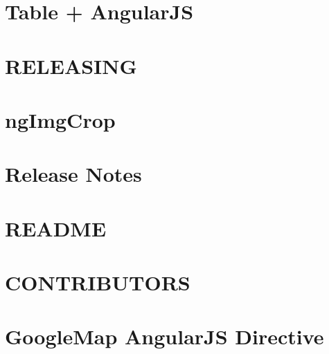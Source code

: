 \documentclass[twoside]{book}
\newcommand{\+}{\discretionary{\mbox{\scriptsize$\hookleftarrow$}}{}{}}
\begin{document}
\chapter{Table + Angular\+JS}
\label{md_app_web_bower_components_ng-table__r_e_a_d_m_e}

\chapter{R\+E\+L\+E\+A\+S\+I\+NG}
\label{md_app_web_bower_components_ng-table__r_e_l_e_a_s_i_n_g}

\chapter{ng\+Img\+Crop}
\label{md_app_web_bower_components_ng_img_crop__r_e_a_d_m_e}

\chapter{Release Notes}
\label{md_app_web_bower_components_ngmap__c_h_a_n_g_e_l_o_g}

\chapter{R\+E\+A\+D\+ME}
\label{md_app_web_bower_components_ngmap_config_jsdoc_template__r_e_a_d_m_e}

\chapter{C\+O\+N\+T\+R\+I\+B\+U\+T\+O\+RS}
\label{md_app_web_bower_components_ngmap__c_o_n_t_r_i_b_u_t_o_r_s}

\chapter{Google\+Map Angular\+JS Directive}
\label{md_app_web_bower_components_ngmap__r_e_a_d_m_e}

\end{document}
